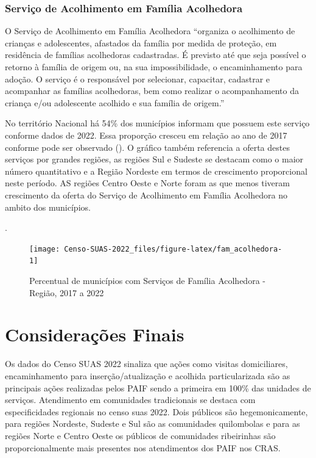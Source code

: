 \documentclass[
  brazilian]{report}
\begin{document}
\hypertarget{serviuxe7o-de-acolhimento-em-famuxedlia-acolhedora}{%
\subsection{Serviço de Acolhimento em Família
Acolhedora}\label{serviuxe7o-de-acolhimento-em-famuxedlia-acolhedora}}

O Serviço de Acolhimento em Família Acolhedora ``organiza o acolhimento
de crianças e adolescentes, afastados da família por medida de proteção,
em residência de famílias acolhedoras cadastradas. É previsto até que
seja possível o retorno à família de origem ou, na sua impossibilidade,
o encaminhamento para adoção. O serviço é o responsável por selecionar,
capacitar, cadastrar e acompanhar as famílias acolhedoras, bem como
realizar o acompanhamento da criança e/ou adolescente acolhido e sua
família de origem.''

No território Nacional há 54\% dos municípios informam que possuem este
serviço conforme dados de 2022. Essa proporção cresceu em relação ao ano
de 2017 conforme pode ser observado (). O
gráfico também referencia a oferta destes serviços por grandes regiões,
as regiões Sul e Sudeste se destacam como o maior número quantitativo e
a Região Nordeste em termos de crescimento proporcional neste período.
AS regiões Centro Oeste e Norte foram as que menos tiveram crescimento
da oferta do Serviço de Acolhimento em Família Acolhedora no ambito dos
municípios.

.

\begin{figure}
\texttt{[image: Censo-SUAS-2022\_files/figure-latex/fam\_acolhedora-1]} \caption[Percentual de municípios com Serviços de Família Acolhedora - Região, 2017 a 2022]{Percentual de municípios com Serviços de Família Acolhedora - Região, 2017 a 2022}\label{fig:fam_acolhedora}
\end{figure}

\hypertarget{considerauxe7uxf5es-finais-2}{%
\chapter{Considerações Finais}\label{considerauxe7uxf5es-finais-2}}

Os dados do Censo SUAS 2022 sinaliza que ações como visitas
domiciliares, encaminhamento para inserção/atualização e acolhida
particularizada são as principais ações realizadas pelos PAIF sendo a
primeira em 100\% das unidades de serviços. Atendimento em comunidades
tradicionais se destaca com especificidades regionais no censo suas
2022. Dois públicos são hegemonicamente, para regiões Nordeste, Sudeste
e Sul são as comunidades quilombolas e para as regiões Norte e Centro
Oeste os públicos de comunidades ribeirinhas são proporcionalmente mais
presentes nos atendimentos dos PAIF nos CRAS.
\end{document}
